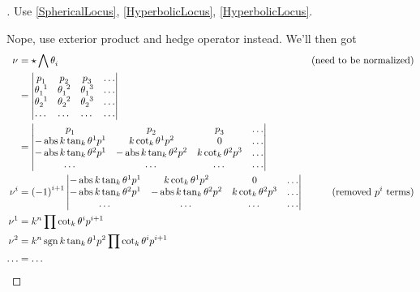 \documentclass[stu, babel, american, biblatex, a4paper, draftall]{apa7}
\begin{document}
\begin{proof}[]
    \skipped

    Use \cref{SphericalLocus}, \cref{HyperbolicLocus}, \cref{HyperbolicLocus}.

    Nope, use exterior product and hedge operator instead.
    We'll then got
    \begin{align*}
        \tensor{\nu}{}
        &= \star\bigwedge{\tensor{\theta}{_i}} & \text{(need to be normalized)}\\
        &= \left\vert
        \begin{matrix}
        \tensor{p}{_1} & \tensor{p}{_2} & \tensor{p}{_3} & \dots \\
        \tensor{\theta}{_1^1} & \tensor{\theta}{_1^2} & \tensor{\theta}{_1^3} & \dots \\
        \tensor{\theta}{_2^1} & \tensor{\theta}{_2^2} & \tensor{\theta}{_2^3} & \dots \\
        \dots & \dots & \dots & \dots \\
        \end{matrix}
        \right\vert \\
        &= \left\vert
        \begin{matrix}
        \tensor{p}{_1} & \tensor{p}{_2} & \tensor{p}{_3} & \dots \\
        -\abs{k}\tan_k{\tensor{\theta}{^1}}\tensor{p}{^1} & k\cot_k{\tensor{\theta}{^1}}\tensor{p}{^2} & 0 & \dots \\
        -\abs{k}\tan_k{\tensor{\theta}{^2}}\tensor{p}{^1} & -\abs{k}\tan_k{\tensor{\theta}{^2}}\tensor{p}{^2} & k\cot_k{\tensor{\theta}{^2}}\tensor{p}{^3} & \dots \\
        \dots & \dots & \dots & \dots \\
        \end{matrix}
        \right\vert \\
        \tensor{\nu}{^i}
        & = \left(-1\right)^{i+1}
        \left\vert
        \begin{matrix}
        -\abs{k}\tan_k{\tensor{\theta}{^1}}\tensor{p}{^1} & k\cot_k{\tensor{\theta}{^1}}\tensor{p}{^2} & 0 & \dots \\
        -\abs{k}\tan_k{\tensor{\theta}{^2}}\tensor{p}{^1} & -\abs{k}\tan_k{\tensor{\theta}{^2}}\tensor{p}{^2} & k\cot_k{\tensor{\theta}{^2}}\tensor{p}{^3} & \dots \\
        \dots & \dots & \dots & \dots \\
        \end{matrix}
        \right\vert & \text{(removed $\tensor{p}{^i}$ terms)} \\
        \tensor{\nu}{^1}
        & = k^n \prod{\cot_k{\tensor{\theta}{^i}}\tensor{p}{^{i+1}}} \\
        \tensor{\nu}{^2}
        & = k^n \sign{k} \tan_k{\tensor{\theta}{^1}}\tensor{p}{^2}\prod{\cot_k{\tensor{\theta}{^i}}\tensor{p}{^{i+1}}} \\
        \dots &= \dots
    \end{align*}
\end{proof}
\end{document}
